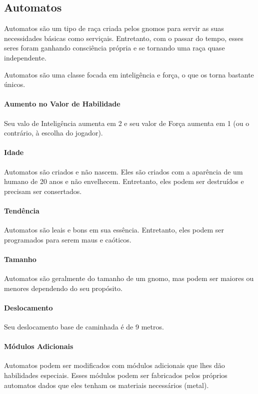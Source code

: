 \begin{multicols}{2}
\section{Automatos}%

Automatos são um tipo de raça criada pelos gnomos para servir as suas
necessidades básicas como serviçais. Entretanto, com o passar do tempo, esses
seres foram ganhando consciência própria e se tornando uma raça quase
independente.

Automatos são uma classe focada em inteligência e força, o que os torna bastante
únicos.

\paragraph{Aumento no Valor de Habilidade}
Seu valo de Inteligência aumenta em 2 e seu valor de Força aumenta em 1 (ou o
contrário, à escolha do jogador).

\paragraph{Idade}
Automatos são criados e não nascem. Eles são criados com a aparência de um
humano de 20 anos e não envelhecem. Entretanto, eles podem ser destruídos e
precisam ser consertados.

\paragraph{Tendência}
Automatos são leais e bons em sua essência. Entretanto, eles podem ser
programados para serem maus e caóticos.

\paragraph{Tamanho}
Automatos são geralmente do tamanho de um gnomo, mas podem ser maiores ou
menores dependendo do seu propósito.

\paragraph{Deslocamento}
Seu deslocamento base de caminhada é de 9 metros.

\paragraph{Módulos Adicionais}
Automatos podem ser modificados com módulos adicionais que lhes dão
habilidades especiais. Esses módulos podem ser fabricados pelos próprios
automatos dados que eles tenham os materiais necessários (metal).


\end{multicols}
